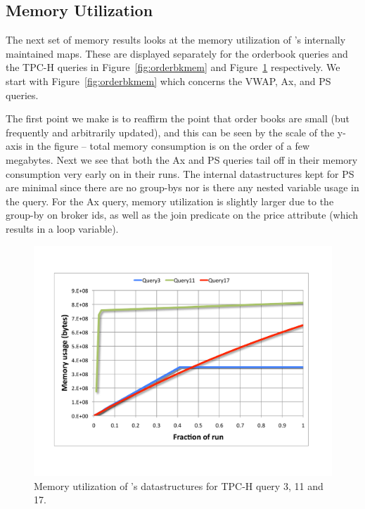 \subsection{Memory Utilization}
The next set of memory results looks at the memory utilization of \compiler's
internally maintained maps. These are displayed separately for the orderbook
queries and the TPC-H queries in Figure~\ref{fig:orderbkmem} and
Figure~\ref{fig:tpchmem} respectively. We start with Figure~\ref{fig:orderbkmem}
which concerns the VWAP, Ax, and PS queries.


The first point we make is to reaffirm the point that order books are small (but
frequently and arbitrarily updated), and this can be seen by the scale of the
y-axis in the figure -- total memory consumption is on the order of a few
megabytes. Next we see that both the Ax and PS queries tail off in their memory
consumption very early on in their runs. The internal datastructures kept for PS
are minimal since there are no group-bys nor is there any nested variable usage
in the query. For the Ax query, memory utilization is slightly larger due to the
group-by on broker ids, as well as the join predicate on the price attribute
(which results in a loop variable).

\begin{figure}[htbp]
\vspace{-9mm}
\includegraphics[scale=0.31]{figures/tpch-mem}
\vspace{-14mm}
\caption{Memory utilization of \compiler's datastructures for TPC-H query 3, 11
  and 17.}
\label{fig:tpchmem}
\end{figure}

